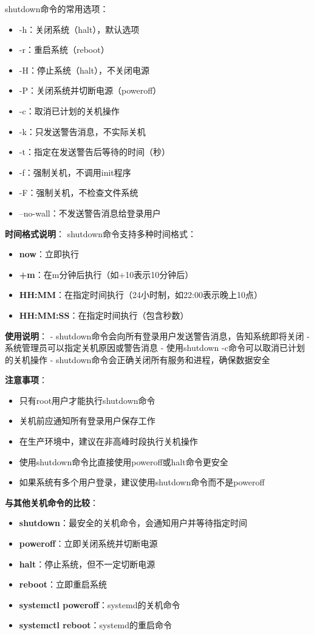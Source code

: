 \documentclass[12pt,UTF8]{ctexbook}
\begin{document}
shutdown命令的常用选项：
\begin{itemize}
    \item -h：关闭系统（halt），默认选项
    \item -r：重启系统（reboot）
    \item -H：停止系统（halt），不关闭电源
    \item -P：关闭系统并切断电源（poweroff）
    \item -c：取消已计划的关机操作
    \item -k：只发送警告消息，不实际关机
    \item -t：指定在发送警告后等待的时间（秒）
    \item -f：强制关机，不调用init程序
    \item -F：强制关机，不检查文件系统
    \item --no-wall：不发送警告消息给登录用户
\end{itemize}

\textbf{时间格式说明}：
shutdown命令支持多种时间格式：
\begin{itemize}
    \item \textbf{now}：立即执行
    \item \textbf{+m}：在m分钟后执行（如+10表示10分钟后）
    \item \textbf{HH:MM}：在指定时间执行（24小时制，如22:00表示晚上10点）
    \item \textbf{HH:MM:SS}：在指定时间执行（包含秒数）
\end{itemize}

\textbf{使用说明}：
- shutdown命令会向所有登录用户发送警告消息，告知系统即将关闭
- 系统管理员可以指定关机原因或警告消息
- 使用shutdown -c命令可以取消已计划的关机操作
- shutdown命令会正确关闭所有服务和进程，确保数据安全

\textbf{注意事项}：
\begin{itemize}
    \item 只有root用户才能执行shutdown命令
    \item 关机前应通知所有登录用户保存工作
    \item 在生产环境中，建议在非高峰时段执行关机操作
    \item 使用shutdown命令比直接使用poweroff或halt命令更安全
    \item 如果系统有多个用户登录，建议使用shutdown命令而不是poweroff
\end{itemize}

\textbf{与其他关机命令的比较}：
\begin{itemize}
    \item \textbf{shutdown}：最安全的关机命令，会通知用户并等待指定时间
    \item \textbf{poweroff}：立即关闭系统并切断电源
    \item \textbf{halt}：停止系统，但不一定切断电源
    \item \textbf{reboot}：立即重启系统
    \item \textbf{systemctl poweroff}：systemd的关机命令
    \item \textbf{systemctl reboot}：systemd的重启命令
\end{itemize}
\end{document}
